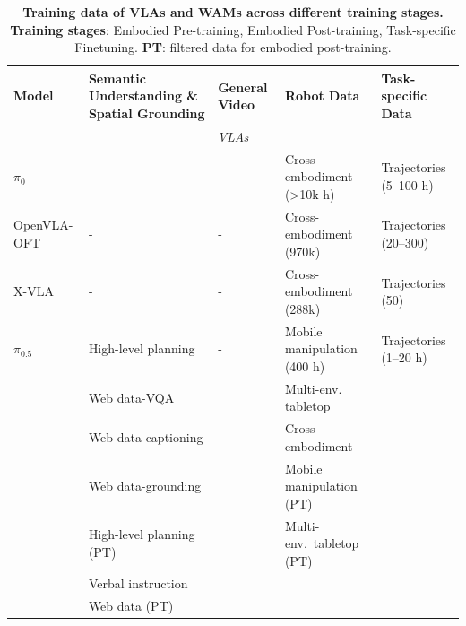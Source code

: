 \documentclass{article}
\begin{document}
\begin{table}[t]
\caption{\textbf{Training data of VLAs and WAMs across different training stages.} \textbf{Training stages}: \colorbox{precolor}{Embodied Pre-training}, \colorbox{postcolor}{Embodied Post-training}, \colorbox{taskcolor}{Task-specific Finetuning}. \textbf{PT}: filtered data for embodied post-training.}
\label{tab:training_data}
\centering
\small
\setlength{\tabcolsep}{4pt}
\begin{tabularx}{\linewidth}{lp{3.5cm}p{2.6cm}p{3.8cm}p{3cm}}
\toprule
\textbf{Model}
  & \textbf{Semantic Understanding \& Spatial Grounding}
  & \textbf{General Video}
  & \textbf{Robot Data}
  & \textbf{Task-specific Data} \\
\midrule

\multicolumn{5}{c}{\textit{VLAs}} \\

\arrayrulecolor{lightgray}
\midrule

$\pi_0$
  & -
  & -
  & \colorbox{precolor}{Cross-embodiment (>10k h)}
  & \colorbox{taskcolor}{Trajectories (5--100 h)} \\[4pt]

OpenVLA-OFT
  & -
  & -
  & \colorbox{precolor}{Cross-embodiment (970k)}
  & \colorbox{taskcolor}{Trajectories (20--300)} \\[4pt]

X-VLA
  & -
  & -
  & \colorbox{precolor}{Cross-embodiment (288k)}
  & \colorbox{taskcolor}{Trajectories (50)} \\[4pt]

$\pi_{0.5}$
  & \colorbox{precolor}{High-level planning} & -
  & \colorbox{precolor}{Mobile manipulation (400 h)}
  & \colorbox{taskcolor}{Trajectories (1--20 h)}
  \\
  & \colorbox{precolor}{Web data-VQA} & 
  & \colorbox{precolor}{Multi-env. tabletop} & 
  \\
  & \colorbox{precolor}{Web data-captioning} &
  & \colorbox{precolor}{Cross-embodiment} & 
  \\
  & \colorbox{precolor}{Web data-grounding} & & \colorbox{postcolor}{Mobile manipulation (PT)} & 
  \\
  & \colorbox{postcolor}{High-level planning (PT)} & & \colorbox{postcolor}{Multi-env.\ tabletop (PT)} & 
  \\
  & \colorbox{postcolor}{Verbal instruction} & & &
  \\
  & \colorbox{postcolor}{Web data (PT)} & & &  
  \\[4pt] 


\end{tabularx}
\end{table}
\end{document}
